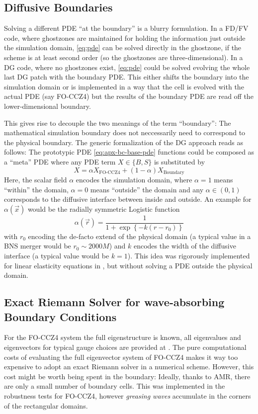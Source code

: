 \subsection*{Diffusive Boundaries}
Solving a different PDE ``at the boundary'' is a blurry formulation. In a
FD/FV code, where ghostzones are maintained for holding the information just
outside the simulation domain, \eqref{eq:pde} can be solved directly in the
ghostzone, if the scheme is at least second order (so the ghostzones are
three-dimensional). In a DG code, where no ghostzones exist, \eqref{eq:pde}
could be solved evolving the whole last DG patch with the boundary PDE. This
either shifts the boundary into the simulation domain or is implemented in a way
that the cell is evolved with the actual PDE (say FO-CCZ4) but the results of
the boundary PDE are read off the lower-dimensional boundary.

This gives rise to decouple the two meanings of the term ``boundary'': The
mathematical simulation boundary does not neccessarily need to correspond to
the physical boundary. The generic formalization of the DG approach reads as
follows: The prototypic PDE \eqref{eq:apx-bc-base-pde} functions
could be composed as a ``meta'' PDE where any PDE term $X\in \{B, S\}$ is
substituted by
\begin{equation}
X = \alpha X_\text{FO-CCZ4} + (1-\alpha) X_\text{Boundary}
\end{equation}
Here, the scalar field $\alpha$ encodes the simulation domain, where
$\alpha=1$ means ``within'' the domain, $\alpha=0$ means ``outside'' the
domain and any $\alpha \in (0,1)$ corresponds to the diffusive interface
between inside and outside. An example for $\alpha(\vec x)$ would be the
radially symmetric Logistic function
\begin{equation}
\alpha(\vec r) = \frac{1}{1 + \exp \left\{ -k(r - r_0)  \right\}}
\end{equation}
with $r_0$ encoding the de-facto extend of the physical domain (\ie a typical
value in a BNS merger would be $r_0 \sim 2000M$) and $k$ encodes the width of
the diffusive interface (a typical value would be $k=1$). This idea was
rigorously implemented for linear elasticity equations in \cite{Tavelli2018},
but without solving a PDE outside the physical domain.

\subsection[
  Exact wave-absorbing Riemann Solver
]{Exact Riemann Solver for wave-absorbing Boundary Conditions}
For the FO-CCZ4 system the full eigenstructure is known, all eigenvalues and
eigenvectors for typical gauge choices are provided at \cite{Dumbser2017}.
The pure computational costs of evaluating the full eigenvector system of
FO-CCZ4 makes it way too expensive to adopt an exact Riemann solver in a
numerical scheme. However, this cost might be worth being spent in the
boundary: Ideally, thanks to AMR, there are only a small number of boundary
cells. This was implemented in the robustness tests for FO-CCZ4, however
\emph{greasing waves} accumulate in the corners of the rectangular domains.

